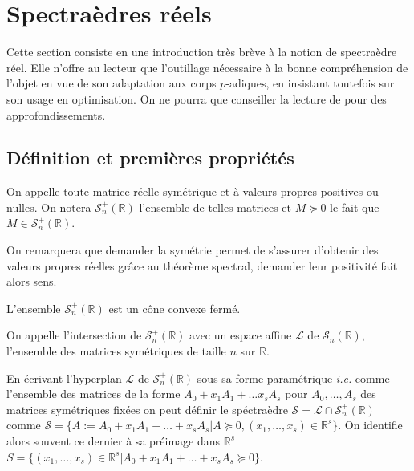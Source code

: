 \section{Spectraèdres réels}
\label{sec:casreel} 
Cette section consiste en une introduction très brève à la notion de spectraèdre réel. Elle n'offre au lecteur que l'outillage nécessaire à la bonne compréhension de l'objet en vue de son adaptation aux corps $p$-adiques, en insistant toutefois sur son usage en optimisation. On ne pourra que conseiller la lecture de \cite{grigoriy_semidefinite_2012} pour des approfondissements.  
\subsection{Définition et premières propriétés}

\begin{definition}
	On appelle  toute matrice réelle symétrique et à valeurs propres positives ou nulles.
	On notera $\mathcal{S}_n^+\left(\mathbb{R}\right) $ l'ensemble de telles matrices et $M \succeq 0$ le fait que $M \in \mathcal{S}_n^+\left(\mathbb{R}\right)$.
\end{definition}

\begin{remarque}
	On remarquera que demander la symétrie permet de s'assurer d'obtenir des valeurs propres réelles grâce au théorème spectral, demander leur positivité fait alors sens.
\end{remarque}
\begin{propriete}
	L'ensemble $\mathcal{S}_n^+\left( \mathbb{R} \right) $ est un cône convexe fermé.
\end{propriete}

\begin{definition}
	On appelle  l'intersection de $\mathcal{S}_n^+\left(\mathbb{R}\right)$ avec un espace affine $\mathcal{L}$ de $\mathcal{S}_n\left(\mathbb{R}\right)$, l'ensemble des matrices symétriques de taille $n$ sur $\mathbb{R}$.
\end{definition}

En écrivant l'hyperplan $\mathcal{L}$ de $\mathcal{S}_n^+\left(\mathbb{R}\right)$ sous sa forme paramétrique \textit{i.e.} comme l'ensemble des matrices de la forme $A_0 + x_1 A_1 + \ldots x_s A_s$ pour $A_0,\ldots, A_s$ des matrices symétriques fixées on peut définir le spéctraèdre $\mathcal{S} = \mathcal{L} \cap \mathcal{S}_n^+\left(\mathbb{R}\right)$ comme
$\mathcal{S} = \{A := A_0 + x_1A_1 + \ldots + x_s A_s | A \succeq 0, (x_1,\ldots,x_s) \in \mathbb{R}^s\}$. On identifie alors souvent ce dernier à sa préimage dans $\mathbb{R}^s$
$S = \{(x_1,\ldots,x_s) \in \mathbb{R}^s | A_0+ x_1A_1 + \ldots+ x_s A_s \succeq 0 \}. $


